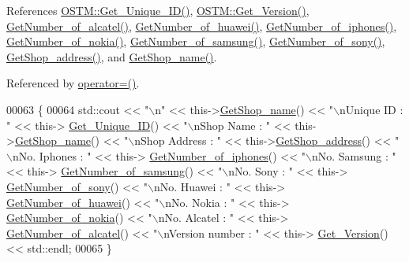 References \hyperlink{_o_s_t_m_8cpp_source_l00073}{O\+S\+T\+M\+::\+Get\+\_\+\+Unique\+\_\+\+I\+D()}, \hyperlink{_o_s_t_m_8cpp_source_l00089}{O\+S\+T\+M\+::\+Get\+\_\+\+Version()}, \hyperlink{_s_l_i_g_o___w_8cpp_source_l00073}{Get\+Number\+\_\+of\+\_\+alcatel()}, \hyperlink{_s_l_i_g_o___w_8cpp_source_l00089}{Get\+Number\+\_\+of\+\_\+huawei()}, \hyperlink{_s_l_i_g_o___w_8cpp_source_l00113}{Get\+Number\+\_\+of\+\_\+iphones()}, \hyperlink{_s_l_i_g_o___w_8cpp_source_l00081}{Get\+Number\+\_\+of\+\_\+nokia()}, \hyperlink{_s_l_i_g_o___w_8cpp_source_l00105}{Get\+Number\+\_\+of\+\_\+samsung()}, \hyperlink{_s_l_i_g_o___w_8cpp_source_l00097}{Get\+Number\+\_\+of\+\_\+sony()}, \hyperlink{_s_l_i_g_o___w_8cpp_source_l00129}{Get\+Shop\+\_\+address()}, and \hyperlink{_s_l_i_g_o___w_8cpp_source_l00121}{Get\+Shop\+\_\+name()}.



Referenced by \hyperlink{_s_l_i_g_o___w_8h_source_l00075}{operator=()}.


\begin{DoxyCode}
00063 \{
00064     std::cout << \textcolor{stringliteral}{"\(\backslash\)n"} <<  this->\hyperlink{class_s_l_i_g_o___w_ae788518e30d9d311eb28f37da932367a_ae788518e30d9d311eb28f37da932367a}{GetShop\_name}() << \textcolor{stringliteral}{"\(\backslash\)nUnique ID : "} << this->
      \hyperlink{class_o_s_t_m_a5a01a8b98d16b1d1904ecf9356e7b71d_a5a01a8b98d16b1d1904ecf9356e7b71d}{Get\_Unique\_ID}() << \textcolor{stringliteral}{"\(\backslash\)nShop Name : "}  << this->\hyperlink{class_s_l_i_g_o___w_ae788518e30d9d311eb28f37da932367a_ae788518e30d9d311eb28f37da932367a}{GetShop\_name}() << \textcolor{stringliteral}{"\(\backslash\)nShop Address : 
      "} << this->\hyperlink{class_s_l_i_g_o___w_a66a2315d531231e34c5056e9bc917797_a66a2315d531231e34c5056e9bc917797}{GetShop\_address}() << \textcolor{stringliteral}{"\(\backslash\)nNo. Iphones : "} << this->
      \hyperlink{class_s_l_i_g_o___w_a780b3a690f5cbbf7593ffc6612b3d743_a780b3a690f5cbbf7593ffc6612b3d743}{GetNumber\_of\_iphones}() << \textcolor{stringliteral}{"\(\backslash\)nNo. Samsung : "} << this->
      \hyperlink{class_s_l_i_g_o___w_aa4b6200a00c2a14924b7ff1ae3896b61_aa4b6200a00c2a14924b7ff1ae3896b61}{GetNumber\_of\_samsung}() << \textcolor{stringliteral}{"\(\backslash\)nNo. Sony : "} << this->
      \hyperlink{class_s_l_i_g_o___w_a62822c4fb80f739bee61767238a29e14_a62822c4fb80f739bee61767238a29e14}{GetNumber\_of\_sony}() << \textcolor{stringliteral}{"\(\backslash\)nNo. Huawei : "} << this->
      \hyperlink{class_s_l_i_g_o___w_a5804f623f4eb290df4f6b3aba59230d6_a5804f623f4eb290df4f6b3aba59230d6}{GetNumber\_of\_huawei}() << \textcolor{stringliteral}{"\(\backslash\)nNo. Nokia : "} << this->
      \hyperlink{class_s_l_i_g_o___w_a1aa9c9f001b37f3fdcdffae009319298_a1aa9c9f001b37f3fdcdffae009319298}{GetNumber\_of\_nokia}() << \textcolor{stringliteral}{"\(\backslash\)nNo. Alcatel : "} << this->
      \hyperlink{class_s_l_i_g_o___w_a5afed1018d0629a1e08fc266d05a94d9_a5afed1018d0629a1e08fc266d05a94d9}{GetNumber\_of\_alcatel}() << \textcolor{stringliteral}{"\(\backslash\)nVersion number : "} << this->
      \hyperlink{class_o_s_t_m_a1f1db9d482f22c8e7caa17dfb340626b_a1f1db9d482f22c8e7caa17dfb340626b}{Get\_Version}() << std::endl;
00065 \}
\end{DoxyCode}


